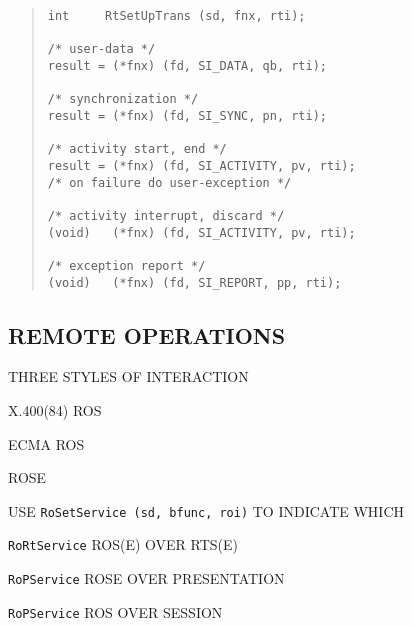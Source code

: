 \begin{bwslide}

\begin{quote}\small\begin{verbatim}
int     RtSetUpTrans (sd, fnx, rti);

/* user-data */
result = (*fnx) (fd, SI_DATA, qb, rti);

/* synchronization */
result = (*fnx) (fd, SI_SYNC, pn, rti);

/* activity start, end */
result = (*fnx) (fd, SI_ACTIVITY, pv, rti);
/* on failure do user-exception */

/* activity interrupt, discard */
(void)   (*fnx) (fd, SI_ACTIVITY, pv, rti);

/* exception report */
(void)   (*fnx) (fd, SI_REPORT, pp, rti);

\end{verbatim}\end{quote}
\end{bwslide}


\begin{bwslide}
\part*	{REMOTE OPERATIONS}\bf

\begin{nrtc}
\item	THREE STYLES OF INTERACTION
    \begin{nrtc}
    \item	X.400(84) ROS

    \item	ECMA ROS

    \item	ROSE
    \end{nrtc}

\item	USE \verb"RoSetService (sd, bfunc, roi)" TO INDICATE WHICH
    \begin{nrtc}
    \item	\verb"RoRtService" ROS(E) OVER RTS(E)

    \item	\verb"RoPService" ROSE OVER PRESENTATION

    \item	\verb"RoPService" ROS OVER SESSION
    \end{nrtc}
\end{nrtc}
\end{bwslide}


